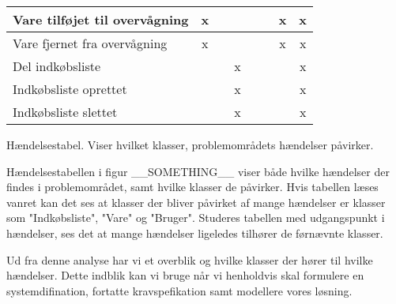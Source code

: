 \begin{table}[h]
\begin{tabular}{|l|l|c|c|c|c|c|c|c|}
\multicolumn{2}{|l|}{Vare tilføjet til overvågning} & x                           &                            &                                   &                           &                               & x                         & x                           \\ \hline
\multicolumn{2}{|l|}{Vare fjernet fra overvågning}  & x                           &                            &                                   &                           &                               & x                         & x                           \\ \hline
\multicolumn{2}{|l|}{Del indkøbsliste}              &                             &                            & x                                 &                           &                               &                           & x                           \\ \hline
\multicolumn{2}{|l|}{Indkøbsliste oprettet}         &                             &                            & x                                 &                           &                               &                           & x                           \\ \hline
\multicolumn{2}{|l|}{Indkøbsliste slettet}          &                             &                            & x                                 &                           &                               &                           & x                           \\ \hline
\end{tabular}
Hændelsestabel. Viser hvilket klasser, problemområdets hændelser påvirker.
\end{table}	

Hændelsestabellen i figur __SOMETHING__ viser både hvilke hændelser der findes i problemområdet, samt hvilke klasser de påvirker.
Hvis tabellen læses vanret kan det ses at klasser der bliver påvirket af mange hændelser er klasser som "Indkøbsliste", "Vare" og "Bruger".
Studeres tabellen med udgangspunkt i hændelser, ses det at mange hændelser ligeledes tilhører de førnævnte klasser.



Ud fra denne analyse har vi et overblik og hvilke klasser der hører til hvilke hændelser.
Dette indblik kan vi bruge når vi henholdvis skal formulere en systemdifination, fortatte kravspefikation samt modellere vores løsning. 